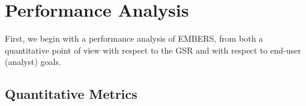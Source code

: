 \section{Performance Analysis}
\label{sec:perf}
First, we begin with a performance analysis of EMBERS, from both a quantitative
point of view with respect to the GSR and with respect to end-user (analyst) goals.
\subsection{Quantitative Metrics}
\begin{figure}



\end{figure}
